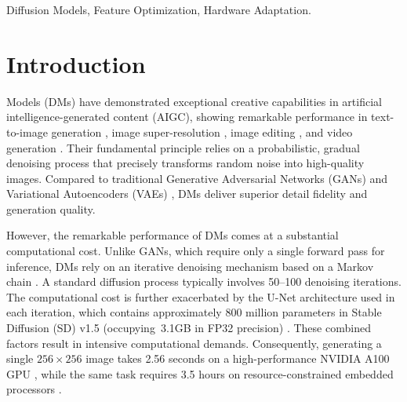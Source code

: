 \begin{IEEEkeywords}
Diffusion Models, Feature Optimization, Hardware Adaptation.
\end{IEEEkeywords}

\section{Introduction}
 Models (DMs) have demonstrated exceptional creative capabilities in artificial intelligence-generated content (AIGC), showing remarkable performance in text-to-image generation \cite{text-img-1}\cite{text-img-2}, image super-resolution \cite{img-super-resolution-1}\cite{img-super-resolution-2}, image editing \cite{img-edit-1}\cite{img-edit-2}, and video generation \cite{video-gen-1} \cite{video-gen-2}. Their fundamental principle relies on a probabilistic, gradual denoising process that precisely transforms random noise into high-quality images. Compared to traditional Generative Adversarial Networks (GANs) \cite{gan-1}\cite{gan-2} and Variational Autoencoders (VAEs) \cite{vae-1}\cite{vae-2}, DMs deliver superior detail fidelity and generation quality.

However, the remarkable performance of DMs comes at a substantial computational cost. Unlike GANs, which require only a single forward pass for inference, DMs rely on an iterative denoising mechanism based on a Markov chain \cite{markov}. A standard diffusion process typically involves 50–100 denoising iterations. The computational cost is further exacerbated by the U-Net architecture \cite{unet} used in each iteration, which contains approximately 800 million parameters in Stable Diffusion (SD) v1.5 \cite{sd} (occupying~3.1GB in FP32 precision) \cite{sda}. These combined factors result in intensive computational demands. Consequently, generating a single $256 \times 256$ image takes 2.56 seconds on a high-performance NVIDIA A100 GPU \cite{isscc24}, while the same task requires 3.5 hours on resource-constrained embedded processors \cite{sda}.

